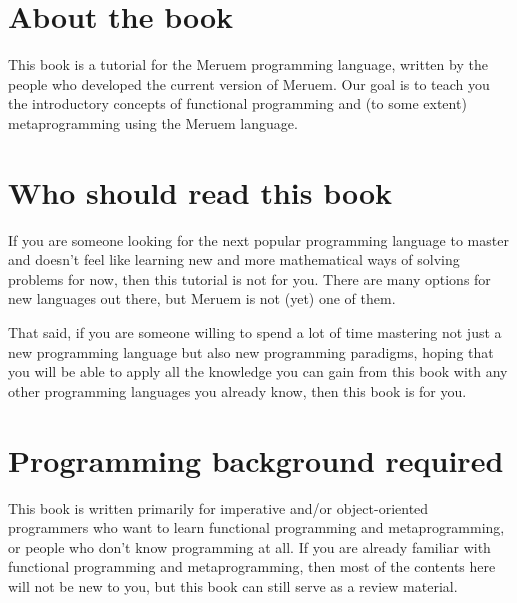 \section{About the book}
This book is a tutorial for the Meruem programming language, written by the people who developed the current version of Meruem. Our goal is to teach you the introductory concepts of functional programming and (to some extent) metaprogramming using the Meruem language. 

\section{Who should read this book}
If you are someone looking for the next popular programming language to master and doesn't feel like learning new and more mathematical ways of solving problems for now, then this tutorial is not for you. There are many options for new languages out there, but Meruem is not (yet) one of them.

That said, if you are someone willing to spend a lot of time mastering not just a new programming language but also new programming paradigms, hoping that you will be able to apply all the knowledge you can gain from this book with any other programming languages you already know, then this book is for you.

\section{Programming background required}
This book is written primarily for imperative and/or object-oriented programmers who want to learn functional programming and metaprogramming, or people who don't know programming at all. If you are already familiar with functional programming and metaprogramming, then most of the contents here will not be new to you, but this book can still serve as a review material.